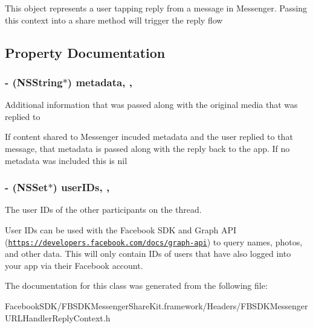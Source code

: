 This object represents a user tapping reply from a message in Messenger. Passing this context into a share method will trigger the reply flow 

\subsection{Property Documentation}
\hypertarget{interface_f_b_s_d_k_messenger_u_r_l_handler_reply_context_a6c5f74a436e2dbf6443853c9a64b725f}{
\subsubsection[{metadata}]{\setlength{\rightskip}{0pt plus 5cm}-\/ (N\-S\-String$\ast$) metadata\hspace{0.3cm}{\ttfamily [read]}, {\ttfamily [nonatomic]}, {\ttfamily [copy]}}}\label{interface_f_b_s_d_k_messenger_u_r_l_handler_reply_context_a6c5f74a436e2dbf6443853c9a64b725f}
Additional information that was passed along with the original media that was replied to

If content shared to Messenger incuded metadata and the user replied to that message, that metadata is passed along with the reply back to the app. If no metadata was included this is nil \hypertarget{interface_f_b_s_d_k_messenger_u_r_l_handler_reply_context_ad90f842303b7d910f85ab8996294c011}{
\subsubsection[{user\-I\-Ds}]{\setlength{\rightskip}{0pt plus 5cm}-\/ (N\-S\-Set$\ast$) user\-I\-Ds\hspace{0.3cm}{\ttfamily [read]}, {\ttfamily [nonatomic]}, {\ttfamily [copy]}}}\label{interface_f_b_s_d_k_messenger_u_r_l_handler_reply_context_ad90f842303b7d910f85ab8996294c011}
The user I\-Ds of the other participants on the thread.

User I\-Ds can be used with the Facebook S\-D\-K and Graph A\-P\-I (\href{https://developers.facebook.com/docs/graph-api}{\tt https\-://developers.\-facebook.\-com/docs/graph-\/api}) to query names, photos, and other data. This will only contain I\-Ds of users that have also logged into your app via their Facebook account. 

The documentation for this class was generated from the following file\-:\begin{DoxyCompactItemize}
\item 
Facebook\-S\-D\-K/\-F\-B\-S\-D\-K\-Messenger\-Share\-Kit.\-framework/\-Headers/F\-B\-S\-D\-K\-Messenger\-U\-R\-L\-Handler\-Reply\-Context.\-h\end{DoxyCompactItemize}
